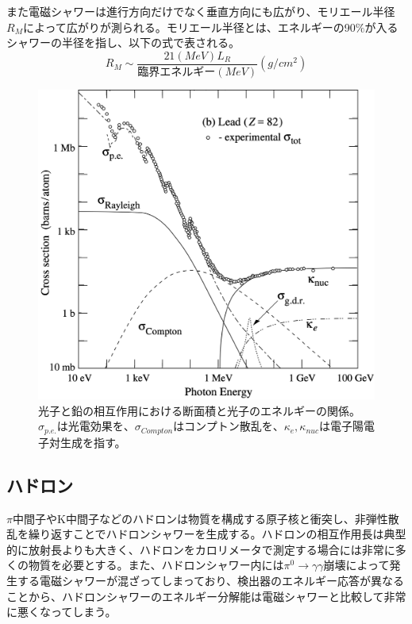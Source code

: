  また電磁シャワーは進行方向だけでなく垂直方向にも広がり、モリエール半径$R_M$によって広がりが測られる。モリエール半径とは、エネルギーの90$\%$が入るシャワーの半径を指し、以下の式で表される。
\begin{equation}
 \label{moliere}
 R_M \sim \frac{21 (MeV) L_R}{臨界エネルギー (MeV)}  (g/{cm}^2)
\end{equation}
\begin{figure}[h]
	\begin{center}
 \includegraphics[keepaspectratio, scale=0.4]
 	{Figure/Siwecal/photon_crosssection.png}
 		\caption{光子と鉛の相互作用における断面積と光子のエネルギーの関係。${\sigma}_{p.e.}$は光電効果を、${\sigma}_{Compton}$はコンプトン散乱を、${\kappa}_{e}, {\kappa}_{nuc}$は電子陽電子対生成を指す。}
 		\label{photon_cs}
	\end{center}
 \end{figure}
\subsection{ハドロン}
$\pi$中間子やK中間子などのハドロンは物質を構成する原子核と衝突し、非弾性散乱を繰り返すことでハドロンシャワーを生成する。ハドロンの相互作用長は典型的に放射長よりも大きく、ハドロンをカロリメータで測定する場合には非常に多くの物質を必要とする。また、ハドロンシャワー内には${\pi}^0 \rightarrow \gamma \gamma$崩壊によって発生する電磁シャワーが混ざってしまっており、検出器のエネルギー応答が異なることから、ハドロンシャワーのエネルギー分解能は電磁シャワーと比較して非常に悪くなってしまう。
